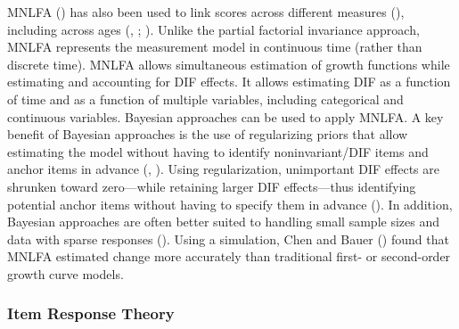 \documentclass[
  american,
  letterpaper,
  12pt]{article}
\begin{document}
MNLFA () has also been used to link
scores across different measures (), including across ages (, ;
). Unlike the partial factorial
invariance approach, MNLFA represents the measurement model in
continuous time (rather than discrete time). MNLFA allows simultaneous
estimation of growth functions while estimating and accounting for DIF
effects. It allows estimating DIF as a function of time and as a
function of multiple variables, including categorical and continuous
variables. Bayesian approaches can be used to apply MNLFA. A key benefit
of Bayesian approaches is the use of regularizing priors that allow
estimating the model without having to identify noninvariant/DIF items
and anchor items in advance (, ). Using regularization,
unimportant DIF effects are shrunken toward zero---while retaining
larger DIF effects---thus identifying potential anchor items without
having to specify them in advance (). In addition, Bayesian approaches are often better
suited to handling small sample sizes and data with sparse responses
(). Using a
simulation, Chen and Bauer () found
that MNLFA estimated change more accurately than traditional first- or
second-order growth curve models.

\subsubsection{Item Response Theory}\label{item-response-theory}
\end{document}
